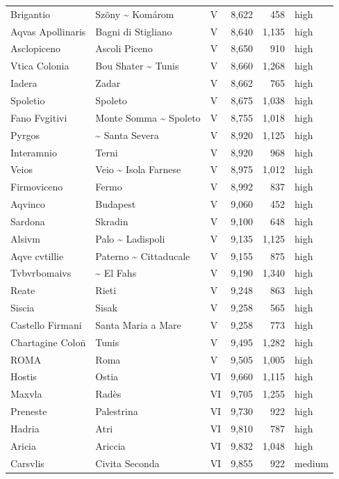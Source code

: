 \documentclass[11pt,a4paper]{article}
\begin{document}
{\begin{longtable}{p{4.6cm}p{5.2cm}lrrl}
Brigantio & Szõny \textasciitilde{} Komárom & V & 8,622 & 458 & high\\
Aqvas Apollinaris & Bagni di Stigliano & V & 8,640 & 1,135 & high\\
Asclopiceno & Ascoli Piceno & V & 8,650 & 910 & high\\
Vtica Colonia & Bou Shater \textasciitilde{} Tunis & V & 8,660 & 1,268 & high\\
Iadera & Zadar & V & 8,662 & 765 & high\\
Spoletio & Spoleto & V & 8,675 & 1,038 & high\\
Fano Fvgitivi & Monte Somma \textasciitilde{} Spoleto & V & 8,755 & 1,018 & high\\
Pyrgos & \textasciitilde{} Santa Severa & V & 8,920 & 1,125 & high\\
Interamnio & Terni & V & 8,920 & 968 & high\\
Veios & Veio \textasciitilde{} Isola Farnese & V & 8,975 & 1,012 & high\\
Firmoviceno & Fermo & V & 8,992 & 837 & high\\
Aqvinco & Budapest & V & 9,060 & 452 & high\\
Sardona & Skradin & V & 9,100 & 648 & high\\
Alsivm & Palo \textasciitilde{} Ladispoli & V & 9,135 & 1,125 & high\\
Aqve cvtillie & Paterno \textasciitilde{} Cittaducale & V & 9,155 & 875 & high\\
Tvbvrbomaivs & \textasciitilde{} El Fahs & V & 9,190 & 1,340 & high\\
Reate & Rieti & V & 9,248 & 863 & high\\
Siscia & Sisak & V & 9,258 & 565 & high\\
Castello Firmani & Santa Maria a Mare & V & 9,258 & 773 & high\\
Chartagine Colon̄ & Tunis & V & 9,495 & 1,282 & high\\
ROMA & Roma & V & 9,505 & 1,005 & high\\
Hostis & Ostia & VI & 9,660 & 1,115 & high\\
Maxvla & Radès & VI & 9,705 & 1,255 & high\\
Preneste & Palestrina & VI & 9,730 & 922 & high\\
Hadria & Atri & VI & 9,810 & 787 & high\\
Aricia & Ariccia & VI & 9,832 & 1,048 & high\\
Carsvlis & Civita Seconda & VI & 9,855 & 922 & medium\\

\end{longtable}}
\end{document}
